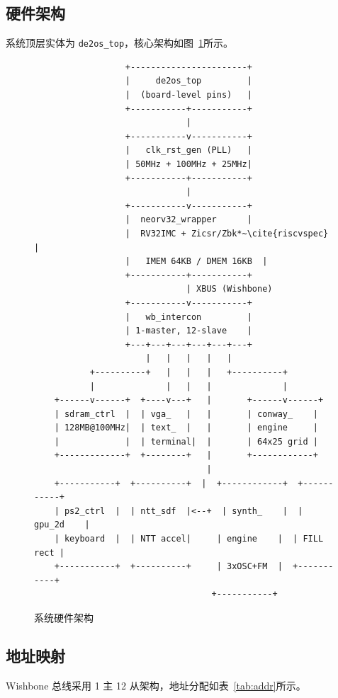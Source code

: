 \documentclass{SYSUReport}
\begin{document}
\subsection{硬件架构}

系统顶层实体为 \texttt{de2os\_top}，核心架构如图~\ref{fig:arch}所示。

\begin{figure}[!htbp]
    \centering
    \begin{verbatim}
                  +-----------------------+
                  |     de2os_top         |
                  |  (board-level pins)   |
                  +-----------+-----------+
                              |
                  +-----------v-----------+
                  |   clk_rst_gen (PLL)   |
                  | 50MHz + 100MHz + 25MHz|
                  +-----------+-----------+
                              |
                  +-----------v-----------+
                  |  neorv32_wrapper      |
                  |  RV32IMC + Zicsr/Zbk*~\cite{riscvspec} |
                  |   IMEM 64KB / DMEM 16KB  |
                  +-----------+-----------+
                              | XBUS (Wishbone)
                  +-----------v-----------+
                  |   wb_intercon         |
                  | 1-master, 12-slave    |
                  +---+---+---+---+---+---+
                      |   |   |   |   |
           +----------+   |   |   |   +----------+
           |              |   |   |              |
    +------v------+  +----v---+   |       +------v------+
    | sdram_ctrl  |  | vga_   |   |       | conway_    |
    | 128MB@100MHz|  | text_  |   |       | engine     |
    |             |  | terminal|  |       | 64x25 grid |
    +-------------+  +--------+   |       +------------+
                                  |
    +-----------+  +----------+  |  +------------+  +-----------+
    | ps2_ctrl  |  | ntt_sdf  |<--+  | synth_    |  | gpu_2d    |
    | keyboard  |  | NTT accel|     | engine    |  | FILL rect |
    +-----------+  +----------+     | 3xOSC+FM  |  +-----------+
                                   +-----------+
    \end{verbatim}
    \caption{系统硬件架构}
    \label{fig:arch}
\end{figure}

\subsection{地址映射}

Wishbone 总线采用 1 主 12 从架构，地址分配如表~\ref{tab:addr}所示。
\end{document}
